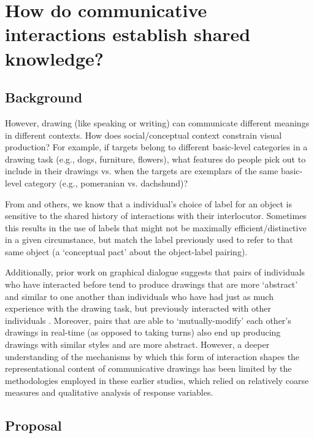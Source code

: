 \documentclass[12pt]{article}
\begin{document}
\section{How do communicative interactions establish shared knowledge?}

\subsection{Background}

However, drawing (like speaking or writing) can communicate different meanings in different contexts. How does social/conceptual context constrain visual production? For example, if targets belong to different basic-level categories in a drawing task (e.g., dogs, furniture, flowers), what features do people pick out to include in their drawings vs. when the targets are exemplars of the same basic-level category (e.g., pomeranian vs. dachshund)? 

From  and others, we know that a individual's choice of label for an object is sensitive to the shared history of interactions with their interlocutor. Sometimes this results in the use of labels that might not be maximally efficient/distinctive in a given circumstance, but match the label previously used to refer to that same object (a ‘conceptual pact’ about the object-label pairing). 

Additionally, prior work on graphical dialogue suggests that pairs of individuals who have interacted before tend to produce drawings that are more `abstract' and similar to one another than individuals who have had just as much experience with the drawing task, but previously interacted with other individuals \cite{Healey:2007vq}. Moreover, pairs that are able to `mutually-modify' each other's drawings in real-time (as opposed to taking turns) also end up producing drawings with similar styles and are more abstract. However, a deeper understanding of the mechanisms by which this form of interaction shapes the representational content of communicative drawings has been limited by the methodologies employed in these earlier studies, which relied on relatively coarse measures and qualitative analysis of response variables. 

\subsection{Proposal}
\end{document}
